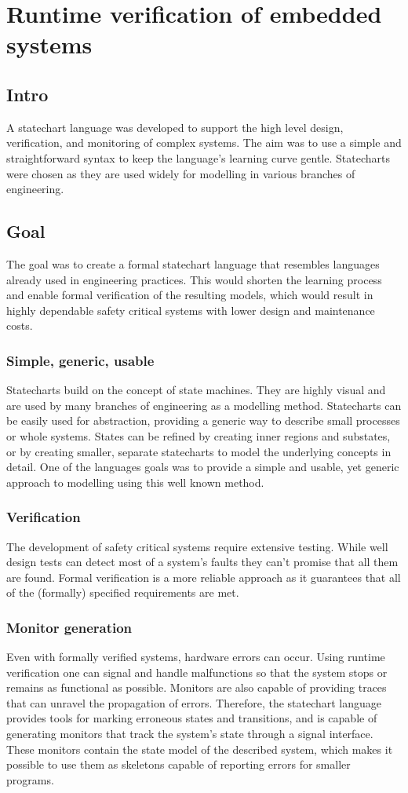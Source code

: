 \chapter{Runtime verification of embedded systems}
\label{chap:runtime_verification}

\section{Intro}
A statechart language was developed to support the high level design, verification, and monitoring of complex systems. The aim was to use a simple and straightforward syntax to keep the language’s learning curve gentle. Statecharts were chosen as they are used widely for modelling in various branches of engineering.
\section{Goal}
The goal was to create a formal statechart language that resembles languages already used in engineering practices. This would shorten the learning process and enable formal verification of the resulting models, which would result in highly dependable safety critical systems with lower design and maintenance costs.
  \subsection{Simple, generic, usable}
Statecharts build on the concept of state machines. They are highly visual and are used by many branches of engineering as a modelling method. Statecharts can be easily used for abstraction, providing a generic way to describe small processes or whole systems. States can be refined by creating inner regions and substates, or by creating smaller, separate statecharts to model the underlying concepts in detail. One of the languages goals was to provide a simple and usable, yet generic approach to modelling using this well known method.
  \subsection{Verification}
The development of safety critical systems require extensive testing. While well design tests can detect most of a system's faults they can't promise that all them are found. Formal verification is a more reliable approach as it guarantees that all of the (formally) specified requirements are met.
  \subsection{Monitor generation}
Even with formally verified systems, hardware errors can occur. Using runtime verification one can signal and handle malfunctions so that the system stops or remains as functional as possible. Monitors are also capable of providing traces that can unravel the propagation of errors. Therefore, the statechart language provides tools for marking erroneous states and transitions, and is capable of generating monitors that track the system's state through a signal interface. These monitors contain the state model of the described system, which makes it possible to use them as skeletons capable of reporting errors for smaller programs.
